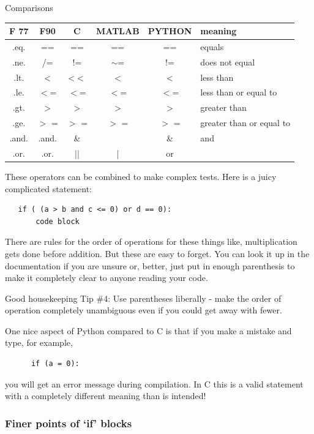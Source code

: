 \documentclass[11pt]{book}
\begin{document}
{\centerline{Comparisons}
\begin{tabular}{cccccl}
\hline
F 77  &   F90    &  C    & MATLAB  & PYTHON  & meaning\\
\hline
.eq.  &  ==   &   ==    &  ==  &     ==   &  equals\\
.ne. &   /=  &    !=   &   $\sim$=    &   !=  &   does not equal\\
.lt.  &  $<$   &    <$<$  &     $<$  &   $<$  &    less than\\
.le.  &  $<$= &     $<$=   &  $<$=   &    $<$=  &   less than or equal to\\
.gt.  & $>$ &      $>$    &   $>$    & $>$   &    greater than\\
.ge.  &  $>$ =   &   $>$ =   &  $>$ =  &    $>$ =  &   greater than or equal to\\
.and. & .and. &   \&&    &  \&  &      and\\
.or.  & .or.  &    ||    &  |   &     or \\ 
\hline
\end{tabular}


These operators can be combined to make complex tests.  Here is a juicy complicated statement:

{ \color{blue} \begin{verbatim}
   if ( (a > b and c <= 0) or d == 0):
       code block
   \end{verbatim}}
\noindent   
There are rules for the order of operations for these things like, multiplication gets done before addition.   But these are easy to forget.  You can look it up in the documentation if 
you are unsure or, better, just put in enough parenthesis to 
make it completely clear to anyone reading your code.

\noindent
{\color{magenta}Good housekeeping Tip \#4: Use parentheses liberally - make the order of operation completely unambiguous even if you could get away with fewer. }
  
  
One nice aspect of Python compared to C is that if you make
a mistake and type, for example,

{\color{blue}   \begin{verbatim}
      if (a = 0):
         \end{verbatim}}

\noindent you will get an error message during compilation.  In C this
is a valid statement with a completely different meaning
than is intended!  


\subsubsection{Finer points of `if' blocks}

}
\end{document}
